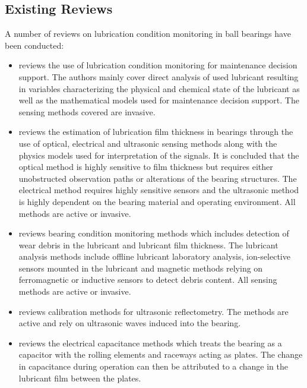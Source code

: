 \subsection{Existing Reviews}
A number of reviews on lubrication condition monitoring in ball bearings have been conducted:
\begin{itemize}
    \item \cite{wakiru_review_2019} reviews the use of lubrication condition monitoring for maintenance decision support. The authors mainly cover direct analysis of used lubricant resulting in variables characterizing the physical and chemical state of the lubricant as well as the mathematical models used for maintenance decision support. The sensing methods covered are invasive.
    \item \cite{shang_comprehensive_2024} reviews the estimation of lubrication film thickness in bearings through the use of optical, electrical and ultrasonic sensing methods along with the physics models used for interpretation of the signals. It is concluded that the optical method is highly sensitive to film thickness but requires either unobstructed observation paths or alterations of the bearing structures. The electrical method requires highly sensitive sensors and the ultrasonic method is highly dependent on the bearing material and operating environment. All methods are active or invasive.
    \item \cite{wang_advanced_2024} reviews bearing condition monitoring methods which includes detection of wear debris in the lubricant and lubricant film thickness. The lubricant analysis methods include offline lubricant laboratory analysis, ion-selective sensors mounted in the lubricant and magnetic methods relying on ferromagnetic or inductive sensors to detect debris content. All sensing methods are active or invasive.
    \item \cite{hansen_comparison_2022} reviews calibration methods for ultrasonic reflectometry. The methods are active and rely on ultrasonic waves induced into the bearing.
    \item \cite{cen_ehl_2021} reviews the electrical capacitance methods which treats the bearing as a capacitor with the rolling elements and raceways acting as plates. The change in capacitance during operation can then be attributed to a change in the lubricant film between the plates.

\end{itemize}
